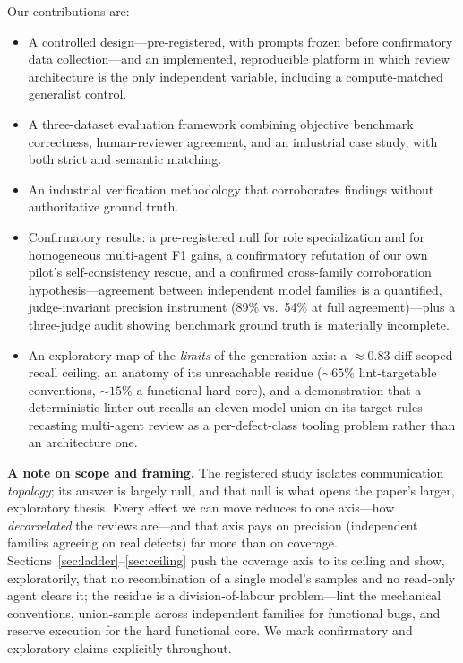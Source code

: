 \documentclass[conference]{IEEEtran}
\begin{document}
Our contributions are:
\begin{itemize}
  \item A controlled design---pre-registered, with prompts frozen before
  confirmatory data collection---and an implemented, reproducible platform
  in which review architecture is the only independent variable, including a
  compute-matched generalist control.
  \item A three-dataset evaluation framework combining objective benchmark
  correctness, human-reviewer agreement, and an industrial case study, with
  both strict and semantic matching.
  \item An industrial verification methodology that corroborates findings
  without authoritative ground truth.
  \item Confirmatory results: a pre-registered null for role
  specialization and for homogeneous multi-agent F1 gains, a confirmatory
  refutation of our own pilot's self-consistency rescue, and a confirmed
  cross-family corroboration hypothesis---agreement between independent
  model families is a quantified, judge-invariant precision instrument
  (89\% vs.\ 54\% at full agreement)---plus a three-judge audit showing
  benchmark ground truth is materially incomplete.
  \item An exploratory map of the \emph{limits} of the generation axis: a
  ${\approx}0.83$ diff-scoped recall ceiling, an anatomy of its unreachable
  residue (${\sim}65\%$ lint-targetable conventions, ${\sim}15\%$ a functional
  hard-core), and a demonstration that a deterministic linter out-recalls an
  eleven-model union on its target rules---recasting multi-agent review as a
  per-defect-class tooling problem rather than an architecture one.
\end{itemize}

\textbf{A note on scope and framing.} The registered study isolates
communication \emph{topology}; its answer is largely null, and that null is what
opens the paper's larger, exploratory thesis. Every effect we can move reduces to
one axis---how \emph{decorrelated} the reviews are---and that axis pays on
precision (independent families agreeing on real defects) far more than on
coverage. Sections~\ref{sec:ladder}--\ref{sec:ceiling} push the coverage axis to
its ceiling and show, exploratorily, that no recombination of a single model's
samples and no read-only agent clears it; the residue is a division-of-labour
problem---lint the mechanical conventions, union-sample across independent
families for functional bugs, and reserve execution for the hard functional core.
We mark confirmatory and exploratory claims explicitly throughout.
\end{document}
